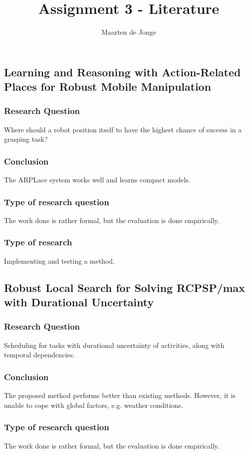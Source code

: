 \documentclass[a4paper, 10pt]{article}
\author{Maarten de Jonge}
\title{Assignment 3 - Literature}
\begin{document}
\maketitle

\section{}
\subsection{Learning and Reasoning with Action-Related Places for Robust Mobile Manipulation}
\subsubsection*{Research Question}
Where should a robot position itself to have the highest chance of success in a
grasping task?
\subsubsection*{Conclusion}
The ARPLace system works well and learns compact models.
\subsubsection*{Type of research question}
The work done is rather formal, but the evaluation is done empirically.
\subsubsection*{Type of research}
Implementing and testing a method.

\subsection{Robust Local Search for Solving RCPSP/max with Durational Uncertainty}
\subsubsection*{Research Question}
Scheduling for tasks with durational uncertainty of activities, along with
temporal dependencies.
\subsubsection*{Conclusion}
The proposed method performs better than existing methods.
However, it is unable to cope with global factors, e.g. weather conditions.
\subsubsection*{Type of research question}
The work done is rather formal, but the evaluation is done empirically.
\end{document}
